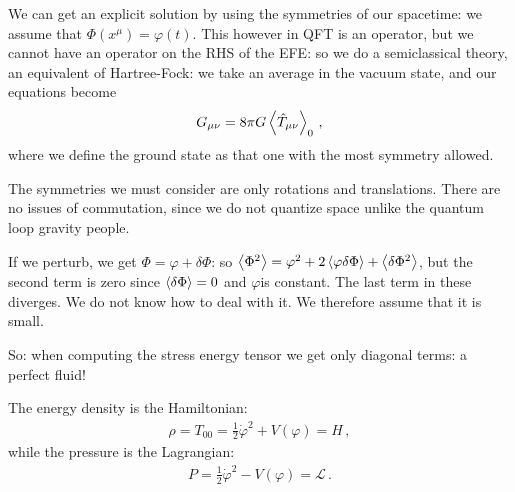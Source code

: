 \documentclass[main.tex]{subfiles}
\begin{document}
We can get an explicit solution by using the symmetries of our spacetime: we assume that \(\Phi (x^{\mu }) = \varphi (t)\).
This however in QFT is an operator, but we cannot have an operator on the RHS of the EFE: so we do a semiclassical theory, an equivalent of Hartree-Fock: we take an average in the vacuum state, and our equations become 
%
\begin{align}
  G_{\mu \nu } = 8 \pi G \expval{\hat{T}_{\mu \nu } }_{0}
\,,
\end{align}
%
where we define the ground state as that one with the most symmetry allowed.

The symmetries we must consider are only rotations and translations.
There are no issues of commutation, since we do not quantize space unlike the quantum loop gravity people.

If we perturb, we get \(\Phi = \varphi + \delta \Phi \): so \(\expval{\Phi^2 } = \varphi^2 + 2 \expval{\varphi \delta \Phi } + \expval{ \delta \Phi^2}\), but the second term is zero since \(\expval{ \delta \Phi } = 0 \) and \(\varphi \)is constant.
The last term in these diverges. We do not know how to deal with it.
We therefore assume that it is small.

So: when computing the stress energy tensor we get only diagonal terms: a perfect fluid!

The energy density is the Hamiltonian:
%
\begin{align}
  \rho = T_{00 } = \frac{1}{2} \dot{\varphi }^2 + V(\varphi ) = H
\,,
\end{align}
%
while the pressure is the Lagrangian: 
%
\begin{align}
  P = \frac{1}{2} \dot{\varphi}^2 - V(\varphi ) = \mathscr{L}
\,.
\end{align}
\end{document}
